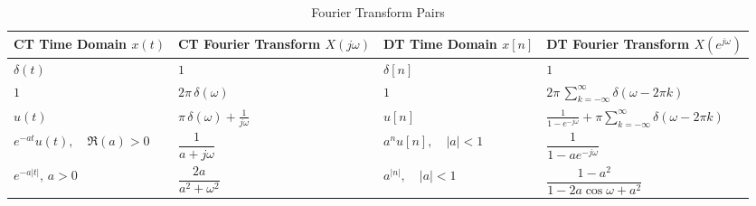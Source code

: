 \documentclass{article}
\begin{document}
\begin{multicols}{2}
    \begin{table*}[ht]
        \centering
        \caption{Fourier Transform Pairs}
        \label{tab:fourier_transform_pairs}
        \small
        \begin{tabular}{@{}llll@{}}
            \toprule
            \textbf{CT Time Domain} $x(t)$                                 & \textbf{CT Fourier Transform} $X(j\omega)$                                    & \textbf{DT Time Domain} $x[n]$                                          & \textbf{DT Fourier Transform} $X(e^{j\omega})$                                                                         \\
            \midrule
            $\delta(t)$                                                    & $1$                                                                           & $\delta[n]$                                                             & $1$                                                                                                                    \\ [1mm]
            $1$                                                            & $2\pi\,\delta(\omega)$                                                        & $1$                                                                     & $2\pi\,\sum_{k=-\infty}^{\infty}\delta(\omega-2\pi k)$                                                                 \\ [1mm]
            $u(t)$                                                         & $\pi\,\delta(\omega) + \frac{1}{j\omega}$                                     & $u[n]$                                                                  & $\frac{1}{1-e^{-j\omega}} + \pi \sum_{k=-\infty}^{\infty} \delta(\omega - 2\pi k)$                                     \\ [1mm]
            $e^{-at}u(t),\quad \Re(a)>0$                                   & $\dfrac{1}{a+j\omega}$                                                        & $a^n u[n],\quad |a|<1$                                                  & $\dfrac{1}{1-ae^{-j\omega}}$                                                                                           \\ [1mm]
            $e^{-a|t|},\, a>0$                                             & $\dfrac{2a}{a^2+\omega^2}$                                                    & $a^{|n|},\quad |a|<1$                                                   & $\dfrac{1-a^2}{1-2a\cos\omega+a^2}$                                                                                    \\ [1mm]

\end{tabular}
\end{table*}
\end{multicols}
\end{document}
